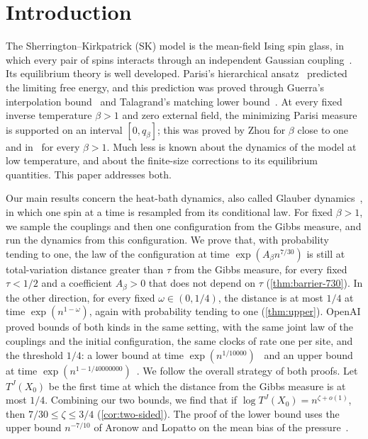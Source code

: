 \chapter{Introduction}\label{sec:intro}

The Sherrington--Kirkpatrick (SK) model is the mean-field Ising spin glass,
in which every pair of spins interacts through an independent Gaussian
coupling~\cite{sk-original}. Its equilibrium theory is well developed.
Parisi's hierarchical ansatz~\cite{parisi-1979} predicted the limiting free
energy, and this prediction was proved through Guerra's interpolation
bound~\cite{guerra-2003} and Talagrand's matching lower
bound~\cite{parisi-formula}. At every fixed inverse temperature $\beta>1$
and zero external field, the minimizing Parisi measure is supported on an
interval $[0,q_\beta]$; this was proved by Zhou for $\beta$ close to
one~\cite[Theorem~1]{zhou-2026} and in~\cite[Theorem~1.1]{full-rsb} for every
$\beta>1$. Much less is known about the
dynamics of the model at low temperature, and about the finite-size
corrections to its equilibrium quantities. This paper addresses both.

Our main results concern the heat-bath dynamics, also called Glauber
dynamics~\cite{glauber-1963}, in which one spin at a time is resampled from
its conditional law. For fixed $\beta>1$, we sample the couplings and then one
configuration from the Gibbs measure, and run the dynamics from this
configuration. We prove that, with probability tending to one, the law of
the configuration at time $\exp(A_\beta n^{7/30})$ is still at total-variation
distance greater than $\tau$ from the Gibbs measure, for every fixed $\tau<1/2$
and a coefficient $A_\beta>0$ that does not depend on $\tau$
(\cref{thm:barrier-730}). In the other direction, for every fixed
$\omega\in(0,1/4)$, the distance is at most $1/4$ at time $\exp(n^{1-\omega})$,
again with probability tending to one (\cref{thm:upper}). OpenAI proved bounds
of both kinds in the same setting, with the same joint law of the couplings
and the initial configuration, the same clocks of rate one per site, and the
threshold $1/4$: a lower bound at time
$\exp(n^{1/10000})$~\cite[Theorem~1.1]{oai-barriers} and an upper bound at
time $\exp(n^{1-1/40000000})$~\cite[Theorem~1]{oai-typical-upper}. We follow
the overall strategy of both proofs. Let $T^J(X_0)$ be the first time at which
the distance from the Gibbs measure is at most $1/4$. Combining our two
bounds, we find that if $\log T^J(X_0)=n^{\zeta+o(1)}$, then
$7/30\le\zeta\le3/4$ (\cref{cor:two-sided}). The proof of the lower bound
uses the upper bound $n^{-7/10}$ of Aronow and Lopatto on the mean bias of
the pressure~\cite[Theorem~1.1]{hexagon-bias}.

